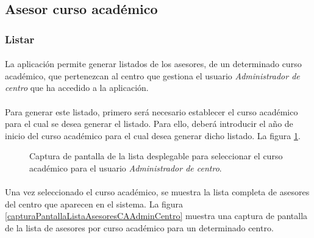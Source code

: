 \subsection{Asesor curso académico}

  \subsubsection{Listar}

  \paragraph{}La aplicación permite generar listados de los asesores, de un
  determinado curso académico, que pertenezcan al centro que gestiona el usuario
  \textit{Administrador de centro} que ha accedido a la aplicación.

  \paragraph{}Para generar este listado, primero será necesario establecer el
  curso académico para el cual se desea generar el listado. Para ello, deberá
  introducir el año de inicio del curso académico para el cual desea generar
  dicho listado. La figura \ref{capturaPantallaSelectCAAdminCentro}.

  \begin{figure}[!ht]
    \begin{center}
      \caption{Captura de pantalla de la lista desplegable para seleccionar el curso académico para el usuario \textit{Administrador de centro}.}
      \label{capturaPantallaSelectCAAdminCentro}
    \end{center}
  \end{figure}

  \paragraph{}Una vez seleccionado el curso académico, se muestra la lista
  completa de asesores del centro que aparecen en el sistema. La figura
  \ref{capturaPantallaListaAsesoresCAAdminCentro} muestra
  una captura de pantalla de la lista de asesores por curso académico para un
  determinado centro.

